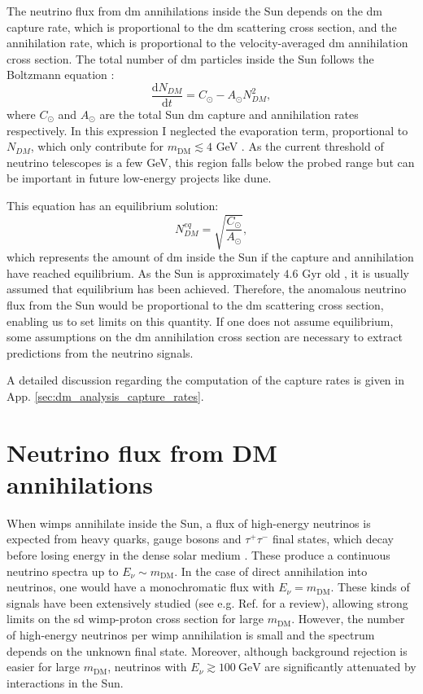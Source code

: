 The neutrino flux from \gls{dm} annihilations inside the Sun depends on the \gls{dm} capture rate, which is proportional to the \gls{dm} scattering cross section, and the annihilation rate, which is proportional to the velocity-averaged \gls{dm} annihilation cross section. The total number of \gls{dm} particles inside the Sun follows the Boltzmann equation \cite{Bernal2012}:
\begin{equation}\label{2.1}
	\frac{\mathrm{d} N_{DM}}{\mathrm{d} t} = C_{\odot} - A_{\odot} N_{DM}^{2},
\end{equation}
where $C_{\odot}$ and $A_{\odot}$ are the total Sun \gls{dm} capture and annihilation rates respectively. In this expression I neglected the evaporation term, proportional to $N_{DM}$, which only contribute for $m_{\mathrm{DM}}\lesssim 4$ GeV \cite{Busoni2013}. As the current threshold of neutrino telescopes is a few GeV, this region falls below the probed range but can be important in future low-energy projects like \gls{dune}.

This equation has an equilibrium solution:
\begin{equation}\label{2.2}
	N_{DM}^{eq} = \sqrt{\frac{C_{\odot}}{A_{\odot}}},
\end{equation}
which represents the amount of \gls{dm} inside the Sun if the capture and annihilation have reached equilibrium. As the Sun is approximately $4.6$ Gyr old \cite{Bahcall1995}, it is usually assumed that equilibrium has been achieved. Therefore, the anomalous neutrino flux from the Sun would be proportional to the \gls{dm} scattering cross section, enabling us to set limits on this quantity. If one does not assume equilibrium, some assumptions on the \gls{dm} annihilation cross section are necessary to extract predictions from the neutrino signals.

A detailed discussion regarding the computation of the capture rates is given in App. \ref{sec:dm_analysis_capture_rates}.

\section{Neutrino flux from DM annihilations}
\label{sec:dm_analysis_flux}

When \gls{wimp}s annihilate inside the Sun, a flux of high-energy neutrinos is expected from heavy quarks, gauge bosons and $\tau^{+}\tau^{-}$ final states, which decay before losing energy in the dense solar medium \cite{Rott2012}. These produce a continuous neutrino spectra up to $E_{\nu} \sim m_{\mathrm{DM}}$. In the case of direct annihilation into neutrinos, one would have a monochromatic flux with $E_{\nu} = m_{\mathrm{DM}}$. These kinds of signals have been extensively studied (see e.g. Ref. \cite{Baratella2013} for a review), allowing strong limits on the \gls{sd} \gls{wimp}-proton cross section for large $m_{\mathrm{DM}}$. However, the number of high-energy neutrinos per \gls{wimp} annihilation is small and the spectrum depends on the unknown final state. Moreover, although background rejection is easier for large $m_{\mathrm{DM}}$, neutrinos with $E_{\nu} \gtrsim 100 ~ \mathrm{GeV}$ are significantly attenuated by interactions in the Sun.

